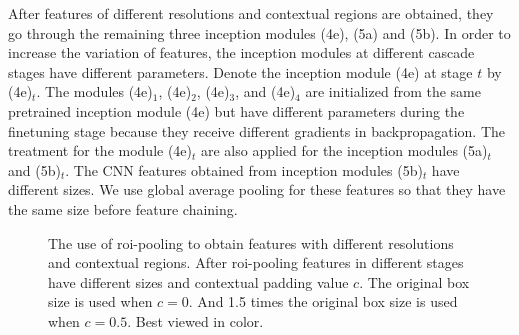 \documentclass[10pt,twocolumn,letterpaper]{article}
\begin{document}
After features of different resolutions and contextual regions are obtained, they go through the remaining three inception modules (4e), (5a) and (5b). In order to increase the variation of features, the inception modules  at different cascade stages have different parameters. Denote the inception module (4e) at stage $t$ by  (4e)$_t$.  The modules (4e)$_1$, (4e)$_2$, (4e)$_3$, and (4e)$_4$  are initialized from the same pretrained inception module (4e) but have different parameters during the finetuning stage because they receive different gradients in  backpropagation. The treatment for the module (4e)$_t$ are also applied for the inception modules (5a)$_t$ and (5b)$_t$. The CNN features obtained from inception modules (5b)$_t$ have different sizes. We use global average pooling for these features so that they have the same size before feature chaining.


\begin{figure}
\begin{center}
\centerline{}
\end{center}
\vspace{-10pt}
   \caption{The use of roi-pooling to obtain features with different resolutions and contextual regions. After roi-pooling features in different stages have different sizes and contextual padding value $c$. The original box size is used when $c=0$. And 1.5 times the original box size is used when $c=0.5$. Best viewed in color.}
\label{fig:Feature}
\end{figure}
\end{document}
